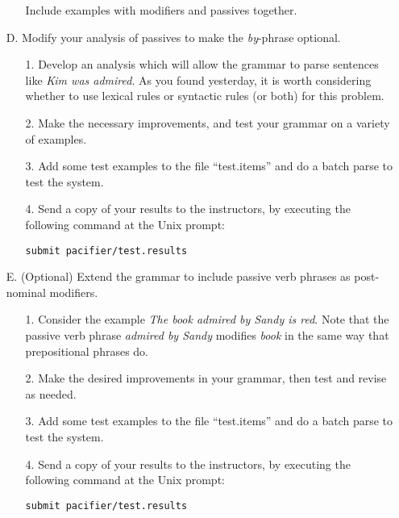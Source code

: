 \documentclass[10pt]{article}
\begin{document}
\begin{itemize}
\begin{itemize}
Include examples with modifiers and passives together.
\end{itemize}
\item[D.] Modify your analysis of passives to make the \emph{by}-phrase optional.
\begin{itemize}
\item[1.]  Develop an analysis which will allow the grammar to parse sentences like \emph{Kim was admired}.  As you found yesterday, it is worth considering whether to use lexical rules or syntactic rules (or both) for this problem.
\item[2.] Make the necessary improvements, and test your grammar on a
variety of examples.
\item[3.] Add some test examples to the file ``test.items'' and do a batch parse to test the system.
\item[4.] Send a copy of your results to the instructors, by executing the
following command at the Unix prompt:
\bigskip
\par\texttt{submit pacifier/test.results}
\bigskip
\end{itemize}
\item[E.] (Optional) Extend the grammar to include passive verb phrases as post-nominal modifiers.
\begin{itemize}
\item[1.] Consider the example \emph{The book admired by Sandy is red}.  Note that the passive verb phrase \emph{admired by Sandy} modifies \emph{book} in the same way that prepositional phrases do.
\item[2.] Make the desired improvements in your grammar, then test and
revise as needed.
\item[3.] Add some test examples to the file ``test.items'' and do a batch parse to test the system.  
\item[4.] Send a copy of your results to the instructors, by executing the
following command at the Unix prompt:
\par\texttt{submit pacifier/test.results}
\end{itemize}
\end{itemize}
\end{document}
